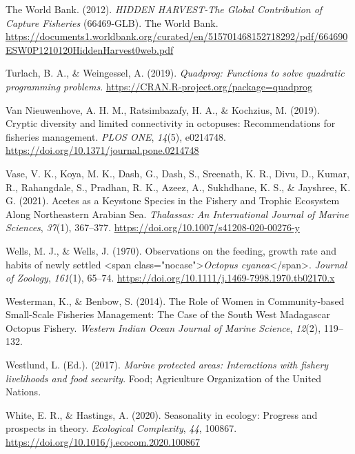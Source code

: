 \documentclass[
]{article}
\newlength{\cslhangindent}
\newlength{\cslentryspacingunit} %
\newenvironment{CSLReferences}[2] %
 {%
  \setlength{\parindent}{0pt}
  \ifodd #1
  \let\oldpar\par
  \def\par{\hangindent=\cslhangindent\oldpar}
  \fi
  \setlength{\parskip}{#2\cslentryspacingunit}
 }%
 {}
\begin{document}
\begin{CSLReferences}{1}{2}
\leavevmode{}%
The World Bank. (2012). \emph{{HIDDEN} {HARVEST}-{The} {Global} {Contribution} of {Capture} {Fisheries}} (66469-GLB). The World Bank. \url{https://documents1.worldbank.org/curated/en/515701468152718292/pdf/664690ESW0P1210120HiddenHarvest0web.pdf}

\leavevmode{}%
Turlach, B. A., \& Weingessel, A. (2019). \emph{Quadprog: Functions to solve quadratic programming problems}. \url{https://CRAN.R-project.org/package=quadprog}

\leavevmode{}%
Van Nieuwenhove, A. H. M., Ratsimbazafy, H. A., \& Kochzius, M. (2019). Cryptic diversity and limited connectivity in octopuses: {Recommendations} for fisheries management. \emph{PLOS ONE}, \emph{14}(5), e0214748. \url{https://doi.org/10.1371/journal.pone.0214748}

\leavevmode{}%
Vase, V. K., Koya, M. K., Dash, G., Dash, S., Sreenath, K. R., Divu, D., Kumar, R., Rahangdale, S., Pradhan, R. K., Azeez, A., Sukhdhane, K. S., \& Jayshree, K. G. (2021). Acetes as a {Keystone} {Species} in the {Fishery} and {Trophic} {Ecosystem} {Along} {Northeastern} {Arabian} {Sea}. \emph{Thalassas: An International Journal of Marine Sciences}, \emph{37}(1), 367--377. \url{https://doi.org/10.1007/s41208-020-00276-y}

\leavevmode{}%
Wells, M. J., \& Wells, J. (1970). Observations on the feeding, growth rate and habits of newly settled {\textless{}}span class="nocase"{\textgreater{}}\emph{{Octopus} cyanea}{\textless{}}/span{\textgreater{}}. \emph{Journal of Zoology}, \emph{161}(1), 65--74. \url{https://doi.org/10.1111/j.1469-7998.1970.tb02170.x}

\leavevmode{}%
Westerman, K., \& Benbow, S. (2014). The {Role} of {Women} in {Community}-based {Small}-{Scale} {Fisheries} {Management}: {The} {Case} of the {South} {West} {Madagascar} {Octopus} {Fishery}. \emph{Western Indian Ocean Journal of Marine Science}, \emph{12}(2), 119--132.

\leavevmode{}%
Westlund, L. (Ed.). (2017). \emph{Marine protected areas: Interactions with fishery livelihoods and food security}. Food; Agriculture Organization of the United Nations.

\leavevmode{}%
White, E. R., \& Hastings, A. (2020). Seasonality in ecology: {Progress} and prospects in theory. \emph{Ecological Complexity}, \emph{44}, 100867. \url{https://doi.org/10.1016/j.ecocom.2020.100867}

\end{CSLReferences}
\end{document}
